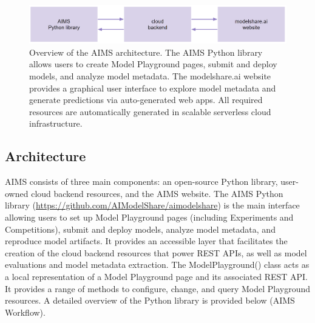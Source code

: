 \begin{figure}
  \centering
  \includegraphics[width=1\textwidth]{figures/fig_aims_architecture.png}
  \caption{Overview of the AIMS architecture. The AIMS Python library allows users to create Model Playground pages, submit and deploy models, and analyze model metadata. The modelshare.ai website provides a graphical user interface to explore model metadata and generate predictions via auto-generated web apps. All required resources are automatically generated in scalable serverless cloud infrastructure.}
  \label{fig:fig_architecture}
\end{figure}

\subsection{Architecture}
AIMS consists of three main components: an open-source Python library, user-owned cloud backend resources, and the AIMS website. The AIMS Python library (\href{https://github.com/AIModelShare/aimodelshare}{https://github.com/AIModelShare/aimodelshare}) is the main interface allowing users to set up Model Playground pages (including Experiments and Competitions), submit and deploy models, analyze model metadata, and reproduce model artifacts. It provides an accessible layer that facilitates the creation of the cloud backend resources that power REST APIs, as well as model evaluations and model metadata extraction. The ModelPlayground() class acts as a local representation of a Model Playground page and its associated REST API. It provides a range of methods to configure, change, and query Model Playground resources. A detailed overview of the Python library is provided below (AIMS Workflow). 

